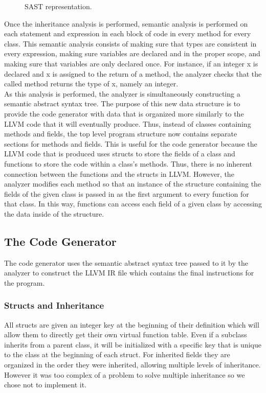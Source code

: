 \begin{homeworkProblem}
\begin{figure}[!ht]
		\caption{SAST representation.}
	\end{figure}
	Once the inheritance analysis is performed, semantic analysis is performed on each statement and expression in each block of code in every method for every class. This semantic analysis consists of making sure that types are consistent in every expression, making sure variables are declared and in the proper scope, and making sure that variables are only declared once. For instance, if an integer x is declared and x is assigned to the return of a method, the analyzer checks that the called method returns the type of x, namely an integer.\\
	As this analysis is performed, the analyzer is simultaneously constructing a semantic abstract syntax tree. The purpose of this new data structure is to provide the code generator with data that is organized more similarly to the LLVM code that it will eventually produce. Thus, instead of classes containing methods and fields, the top level program structure now contains separate sections for methods and fields. This is useful for the code generator because the LLVM code that is produced uses structs to store the fields of a class and functions to store the code within a class's methods. Thus, there is no inherent connection between the functions and the structs in LLVM. However, the analyzer modifies each method so that an instance of the structure containing the fields of the given class is passed in as the first argument to every function for that class. In this way, functions can access each field of a given class by accessing the data inside of the structure. 
	
	\subsection{The Code Generator}
    
    The code generator uses the semantic abstract syntax tree passed to it by the analyzer to construct the LLVM IR file which contains the final instructions for the program. \\
    
    \subsubsection{Structs and Inheritance}
    All structs are given an integer key at the beginning of their definition which will allow them to directly get their own virtual function table. Even if a subclass inherits from a parent class, it will be initialized with a specific key that is unique to the class at the beginning of each struct. For inherited fields they are organized in the order they were inherited, allowing multiple levels of inheritance. However it was too complex of a problem to solve multiple inheritance so we chose not to implement it. 

\end{homeworkProblem}
